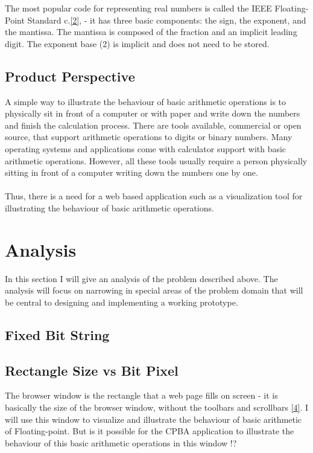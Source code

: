 \documentclass[11pt]{article}
\begin{document}
The most popular code for representing real numbers is called the IEEE Floating-Point Standard c.\ref{2}, - it has three basic components: the sign, the exponent, and the mantissa. The mantissa is composed of the fraction and an implicit leading digit. The exponent base (2) is implicit and does not need to be stored.\\

\subsection{Product Perspective}
A simple way to illustrate the behaviour of basic arithmetic operations is to physically sit in front of a computer or with paper and write down the numbers and finish the calculation process. There are tools available, commercial or open source, that support arithmetic operations to digits or binary numbers. Many operating systems and applications come with calculator support with basic arithmetic operations. However, all these tools usually require a person physically sitting in front of a computer writing down the numbers one by one.\\
\\Thus, there is a need for a web based application such as a visualization tool for illustrating the behaviour of basic arithmetic operations.

\section{Analysis}
In this section I will give an analysis of the problem described above. The analysis will focus on narrowing in special areas of the problem domain that will be central to designing and implementing a working prototype.
\subsection{Fixed Bit String}


\subsection{Rectangle Size vs Bit Pixel}
The browser window is the rectangle that a web page fills on screen - it is basically the size of the browser window, without the toolbars and scrollbars \ref{4}. I will use this window to visualize and illustrate the behaviour of basic arithmetic of Floating-point. But is it possible for the CPBA application to illustrate the behaviour of this basic arithmetic operations in this window !?\\
\end{document}
